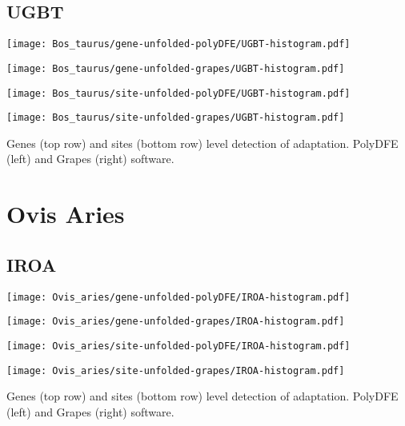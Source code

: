 \documentclass{article}
\begin{document}
\subsection{UGBT}
\centering
\begin{minipage}{0.49\linewidth}
    \texttt{[image: Bos\_taurus/gene-unfolded-polyDFE/UGBT-histogram.pdf]}
\end{minipage}%
\hfill
\begin{minipage}{0.49\linewidth}
    \texttt{[image: Bos\_taurus/gene-unfolded-grapes/UGBT-histogram.pdf]}
\end{minipage}
\begin{minipage}{0.49\linewidth}
    \texttt{[image: Bos\_taurus/site-unfolded-polyDFE/UGBT-histogram.pdf]}
\end{minipage}%
\hfill
\begin{minipage}{0.49\linewidth}
    \texttt{[image: Bos\_taurus/site-unfolded-grapes/UGBT-histogram.pdf]}
\end{minipage}
\flushleft
Genes (top row) and sites (bottom row) level detection of adaptation.
PolyDFE (left) and Grapes (right) software.


\section{Ovis Aries}

\subsection{IROA}
\centering
\begin{minipage}{0.49\linewidth}
    \texttt{[image: Ovis\_aries/gene-unfolded-polyDFE/IROA-histogram.pdf]}
\end{minipage}%
\hfill
\begin{minipage}{0.49\linewidth}
    \texttt{[image: Ovis\_aries/gene-unfolded-grapes/IROA-histogram.pdf]}
\end{minipage}
\begin{minipage}{0.49\linewidth}
    \texttt{[image: Ovis\_aries/site-unfolded-polyDFE/IROA-histogram.pdf]}
\end{minipage}%
\hfill
\begin{minipage}{0.49\linewidth}
    \texttt{[image: Ovis\_aries/site-unfolded-grapes/IROA-histogram.pdf]}
\end{minipage}
\flushleft
Genes (top row) and sites (bottom row) level detection of adaptation.
PolyDFE (left) and Grapes (right) software.
\end{document}
